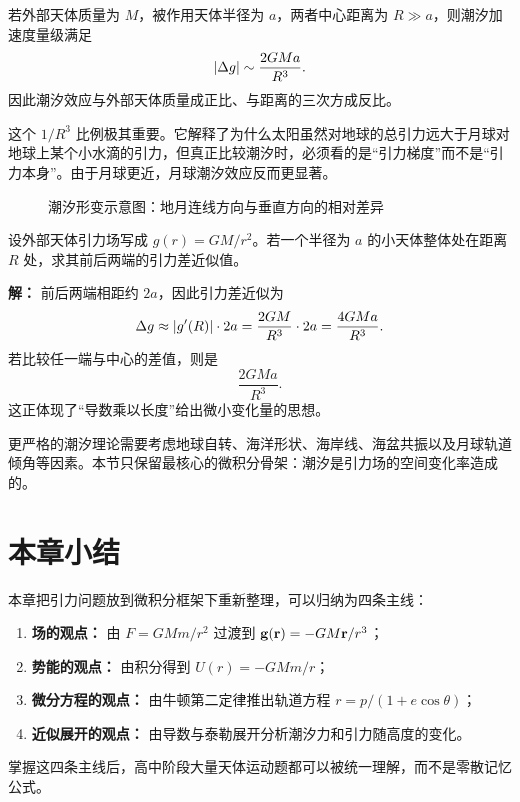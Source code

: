 \begin{theorem}[潮汐加速度的量级]
若外部天体质量为 $M$，被作用天体半径为 $a$，两者中心距离为 $R\gg a$，则潮汐加速度量级满足
\[
\abs{\Delta g}\sim \frac{2GMa}{R^3}.
\]
因此潮汐效应与外部天体质量成正比、与距离的三次方成反比。
\end{theorem}

这个 $1/R^3$ 比例极其重要。它解释了为什么太阳虽然对地球的总引力远大于月球对地球上某个小水滴的引力，但真正比较潮汐时，必须看的是“引力梯度”而不是“引力本身”。由于月球更近，月球潮汐效应反而更显著。

\begin{figure}[H]
\centering
{}
\caption{潮汐形变示意图：地月连线方向与垂直方向的相对差异}
\end{figure}

\begin{example}
设外部天体引力场写成 $g(r)=GM/r^2$。若一个半径为 $a$ 的小天体整体处在距离 $R$ 处，求其前后两端的引力差近似值。

\textbf{解：} 前后两端相距约 $2a$，因此引力差近似为
\[
\Delta g\approx \abs{g'(R)}\cdot 2a=\frac{2GM}{R^3}\cdot 2a=\frac{4GMa}{R^3}.
\]
若比较任一端与中心的差值，则是
\[
\frac{2GMa}{R^3}.
\]
这正体现了“导数乘以长度”给出微小变化量的思想。
\end{example}

\begin{remark}
更严格的潮汐理论需要考虑地球自转、海洋形状、海岸线、海盆共振以及月球轨道倾角等因素。本节只保留最核心的微积分骨架：潮汐是引力场的空间变化率造成的。
\end{remark}

\section*{本章小结}

本章把引力问题放到微积分框架下重新整理，可以归纳为四条主线：
\begin{enumerate}
  \item \textbf{场的观点：} 由 $F=GMm/r^2$ 过渡到 $\vb{g}(\vb{r})=-GM\vb{r}/r^3$；
  \item \textbf{势能的观点：} 由积分得到 $U(r)=-GMm/r$；
  \item \textbf{微分方程的观点：} 由牛顿第二定律推出轨道方程 $r=p/(1+e\cos\theta)$；
  \item \textbf{近似展开的观点：} 由导数与泰勒展开分析潮汐力和引力随高度的变化。
\end{enumerate}
掌握这四条主线后，高中阶段大量天体运动题都可以被统一理解，而不是零散记忆公式。


